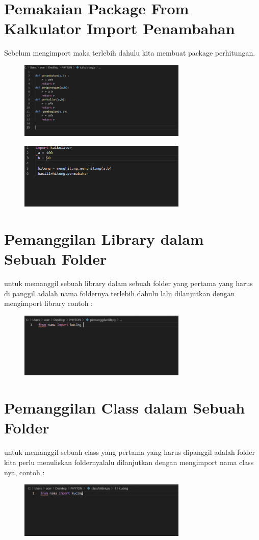 \documentclass{article}
\begin{document}
\section{Pemakaian Package From Kalkulator Import Penambahan}
\par Sebelum mengimport maka terlebih dahulu kita membuat package perhitungan.
\begin{figure}[h]
\centerline{\includegraphics[width=8cm]{figure/f.PNG}}
\end{figure}

\begin{figure}[h]
\centerline{\includegraphics[width=8cm]{figure/g.PNG}}
\end{figure}

\section{Pemanggilan Library dalam Sebuah Folder}
untuk memanggil sebuah library dalam sebuah folder yang pertama yang harus di panggil adalah nama foldernya terlebih dahulu lalu dilanjutkan dengan mengimport library contoh :
\begin{figure}[h]
\centerline{\includegraphics[width=8cm]{figure/d.PNG}}
\end{figure}



\section{Pemanggilan Class dalam Sebuah Folder}
untuk memanggil sebuah class yang pertama yang harus dipanggil adalah folder kita perlu menuliskan foldernyalalu dilanjutkan dengan mengimport nama class nya, contoh :
\begin{figure}[h]
\centerline{\includegraphics[width=8cm]{figure/e.PNG}}
\end{figure}
\end{document}
